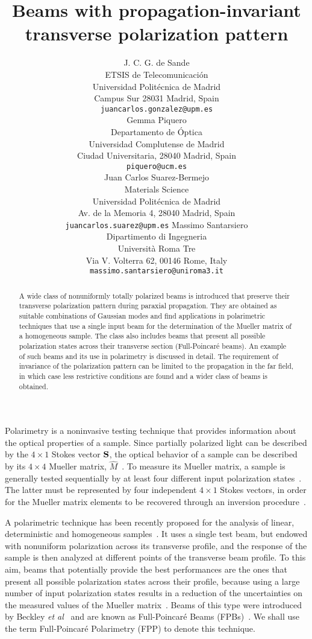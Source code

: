 \documentclass{article}
\title{Beams with propagation-invariant transverse polarization pattern}
\author{ J. C. G. de Sande\\
ETSIS de Telecomunicaci\'{o}n \\ Universidad Polit\'{e}cnica de Madrid \\ Campus Sur 28031 Madrid, Spain\\
    \texttt{juancarlos.gonzalez@upm.es} \\
   \And
 Gemma Piquero \\
  Departamento de \'{O}ptica\\ Universidad Complutense de Madrid\\ Ciudad Universitaria,  28040 Madrid, Spain\\
  \texttt{piquero@ucm.es} \\
  \AND
 Juan Carlos Suarez-Bermejo\\
 Materials Science\\ Universidad Polit\'{e}cnica de Madrid\\ Av. de la Memoria 4, 28040 Madrid, Spain\\
    \texttt{juancarlos.suarez@upm.es} 
   \And
   Massimo Santarsiero\\
   Dipartimento di Ingegneria\\ Universit\`a Roma Tre\\ Via V. Volterra 62, 00146 Rome, Italy\\
   \texttt{massimo.santarsiero@uniroma3.it} \\
}
\begin{document}
\maketitle

\begin{abstract}
A wide class of nonuniformly totally polarized beams is introduced that preserve their transverse polarization pattern during paraxial propagation. They are obtained as suitable combinations of Gaussian modes and find applications in polarimetric techniques that use a single input beam for the determination of the Mueller matrix of a homogeneous sample.
The class also includes beams that present all possible polarization states across their transverse section (Full-Poincar\'e beams). An example of such beams and its use in polarimetry is discussed in detail. The requirement of invariance of the polarization pattern can be limited to the propagation in the far field, in which case less restrictive conditions are found and a wider class of beams is obtained. 
\end{abstract}



Polarimetry is a noninvasive testing technique that provides information about the optical properties of a sample. Since partially polarized light can be described by the $4 \times 1$ Stokes vector $\bf{S}$, the optical behavior of a sample can be described by its $4 \times 4$ Mueller matrix, $\widehat M$~\cite{chipman18, Goldstein03, Gil16}. To measure its Mueller matrix, a sample is generally tested sequentially by at least four different input polarization states~\cite{chipman18}.  The latter must be represented by four independent $4 \times 1$ Stokes vectors, in order for the Mueller matrix elements to be recovered through an inversion procedure~\cite{chipman18, Goldstein03}. 

A polarimetric technique has been recently proposed  for the analysis of linear, deterministic and homogeneous samples~\cite{Sande:OLEN17}. It uses a single test beam, but endowed with nonuniform polarization across its transverse profile, and the response of the sample is then analyzed at different points of the transverse beam profile. To this aim, beams that potentially provide the best performances are the ones that present all possible polarization states across their profile, because using a large number of input polarization states results in a reduction of the uncertainties on the measured values of the Mueller matrix~\cite{SUAREZBERMEJO:OLEN19}. Beams of this type were introduced by Beckley {\it et al}~\cite{Beckley:OE10} and are known as Full-Poincar\'e Beams (FPBs)~\cite{Galvez:AO12,Alieva:JOSAA13,Alpmann:SR17,Li:JAP19}. We shall use the term Full-Poincar\'e Polarimetry (FPP) to denote this technique. 
\end{document}
